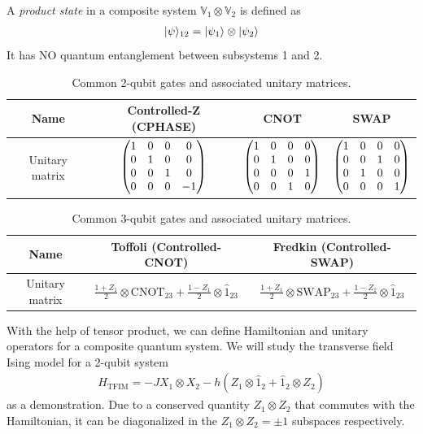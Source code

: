 A \emph{product state} in a composite system $\mathbb{V}_1\otimes\mathbb{V}_2$ is defined as
\begin{align}
    |{\psi}\rangle_{12}=|{\psi_1}\rangle\otimes|{\psi_2}\rangle
\end{align}
It has NO quantum entanglement between subsystems 1 and 2. 

\begin{table}[t]
\centering
\begin{tabular}{|c||c|c|c|}
\hline
Name&Controlled-Z (CPHASE)&CNOT&SWAP\\
\hline
Unitary matrix&$\begin{pmatrix}1&0&0&0\\0&1&0&0\\0&0&1&0\\0&0&0&-1\end{pmatrix}$&$\begin{pmatrix}1&0&0&0\\0&1&0&0\\0&0&0&1\\0&0&1&0\end{pmatrix}$&$\begin{pmatrix}1&0&0&0\\0&0&1&0\\0&1&0&0\\0&0&0&1\end{pmatrix}$\\
\hline
\end{tabular}
\caption{Common 2-qubit gates and associated unitary matrices.}\label{tab:2-qubit gate}
\end{table}

\begin{table}[t]
\centering
\begin{tabular}{|c||c|c|}
\hline
Name&Toffoli (Controlled-CNOT)&Fredkin (Controlled-SWAP)\\
\hline
Unitary matrix&$\frac{1+Z_1}2\otimes\text{CNOT}_{23}+\frac{1-Z_1}2\otimes\hat 1_{23}$&$\frac{1+Z_1}2\otimes\text{SWAP}_{23}+\frac{1-Z_1}2\otimes\hat 1_{23}$\\
\hline
\end{tabular}
\caption{Common 3-qubit gates and associated unitary matrices.}\label{tab:3-qubit gate}
\end{table}

With the help of tensor product, we can define Hamiltonian and unitary operators for a composite quantum system. We will study the transverse field Ising model for a 2-qubit system
\begin{align}
\label{tfim}
H_\text{TFIM}=-JX_1\otimes X_2-h(Z_1\otimes\hat 1_2+\hat 1_2\otimes Z_2)
\end{align}
as a demonstration. Due to a conserved quantity $Z_1\otimes Z_2$ that commutes with the Hamiltonian, it can be diagonalized in the $Z_1\otimes Z_2=\pm1$ subspaces respectively.

